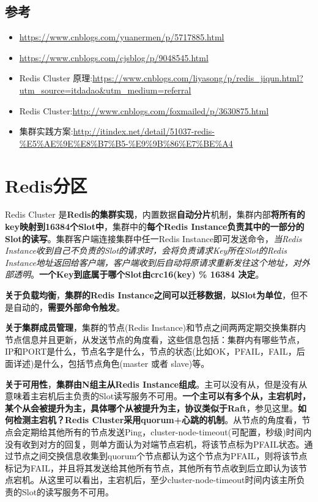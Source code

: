 \documentclass[UTF8,a4paper,12pt]{ctexbook}
\begin{document}
		\subsection{参考}
			\begin{itemize}
				\item \url{https://www.cnblogs.com/yuanermen/p/5717885.html}
				\item \url{https://www.cnblogs.com/cjsblog/p/9048545.html}
				\item Redis Cluster 原理:\url{https://www.cnblogs.com/liyasong/p/redis_jiqun.html?utm_source=itdadao&utm_medium=referral}
				\item Redis Cluster:\url{http://www.cnblogs.com/foxmailed/p/3630875.html}
				\item 集群实践方案:\url{http://itindex.net/detail/51037-redis-%E5%AE%9E%E8%B7%B5-%E9%9B%86%E7%BE%A4}
			\end{itemize}
		
		
	\section{Redis分区}
		Redis Cluster 是\textbf{Redis的集群实现}，内置数据\textbf{自动分片}机制，集群内部\textbf{将所有的key映射到16384个Slot中}，集群中的\textbf{每个Redis Instance负责其中的一部分的Slot的读写}。集群客户端连接集群中任一Redis Instance即可发送命令，\textit{当Redis Instance收到自己不负责的Slot的请求时，会将负责请求Key所在Slot的Redis Instance地址返回给客户端，客户端收到后自动将原请求重新发往这个地址，对外部透明}。\textbf{一个Key到底属于哪个Slot由crc16(key) \% 16384 决定}。
				
		 \textbf{关于负载均衡}，\textbf{集群的Redis Instance之间可以迁移数据}，\textbf{以Slot为单位}，但不是自动的，\textbf{需要外部命令触发}。
			
		 \textbf{关于集群成员管理}，集群的节点(Redis Instance)和节点之间两两定期交换集群内节点信息并且更新，从发送节点的角度看，这些信息包括：集群内有哪些节点，IP和PORT是什么，节点名字是什么，节点的状态(比如OK，PFAIL，FAIL，后面详述)是什么，包括节点角色(master 或者 slave)等。
			
		 \textbf{关于可用性}，\textbf{集群由N组主从Redis Instance组成}。主可以没有从，但是没有从 意味着主宕机后主负责的Slot读写服务不可用。\textbf{一个主可以有多个从，主宕机时，某个从会被提升为主，具体哪个从被提升为主，协议类似于Raft}，参见这里。\textbf{如何检测主宕机？Redis Cluster采用quorum+心跳的机制}。从节点的角度看，节点会定期给其他所有的节点发送Ping，cluster-node-timeout(可配置，秒级)时间内没有收到对方的回复，则单方面认为对端节点宕机，将该节点标为PFAIL状态。通过节点之间交换信息收集到quorum个节点都认为这个节点为PFAIL，则将该节点标记为FAIL，并且将其发送给其他所有节点，其他所有节点收到后立即认为该节点宕机。从这里可以看出，主宕机后，至少cluster-node-timeout时间内该主所负责的Slot的读写服务不可用。
				 
\end{document}
